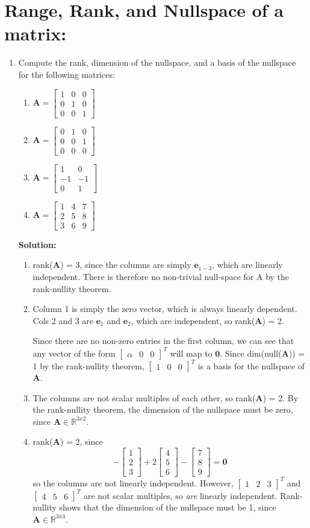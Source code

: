 \documentclass[]{article}
\newcommand{\R}{\mathbb{R}}				%
\newcommand{\bbm}{\begin{bmatrix}}		%
\newcommand{\ebm}{\end{bmatrix}}		%
\newcommand{\A}{\bm{A}}					%
\newcommand{\solution}{\vskip 0.5cm \textbf{\large Solution:} \\}
\begin{document}
    \section*{Range, Rank, and Nullspace of a matrix:}
    \begin{enumerate}[resume]
	\item Compute the rank, dimension of the nullspace, and a basis of the nullspace for the following matrices:
	  \begin{enumerate}
	  \item $\A = \bbm 1&0&0\\0&1&0\\0&0&1 \ebm$
	  \item $\A = \bbm 0&1&0\\0&0&1\\0&0&0 \ebm$
	  \item $\A = \bbm 1&0\\-1&-1\\0&1 \ebm$
	  \item $\A = \bbm 1&4&7\\2&5&8\\3&6&9 \ebm$
	  \end{enumerate}

	  \solution
	  \begin{enumerate}
	  \item rank($\A$) = 3, since the columns are simply
        $\bm{e}_{1-3}$, which are linearly independent. There is
        therefore no non-trivial null-space for A by the rank-nullity
        theorem.
        
	  \item Column 1 is simply the zero vector, which is always
        linearly dependent. Cols 2 and 3 are $\bm{e}_1$ and
        $\bm{e}_2$, which are independent, so rank($\A$) = 2.

        Since there are no non-zero entries in the first column, we
        can see that any vector of the form $ \bbm \alpha & 0 & 0 \ebm^T$ will map
        to $\bm{0}$. Since dim(null($\A$)) = 1 by the rank-nullity
        theorem, $\bbm 1 & 0 & 0 \ebm^T$ is a basis for the nullspace of $\A$.

      \item The columns are not scalar multiples of each other, so
        rank($\A$) = 2. By the rank-nullity theorem, the dimension
        of the nullspace must be zero, since $\A \in \R^{3x2}$.

	  \item rank($\A$) = 2, since
        \[
         -\bbm 1 \\ 2 \\ 3 \ebm + 2 \bbm 4 \\ 5 \\ 6 \ebm - \bbm 7 \\ 8 \\ 9 \ebm = \bm{0}
        \]
        so the columns are not linearly independent. However, $\bbm 1
        & 2 & 3 \ebm^T$ and $\bbm 4 & 5 & 6 \ebm^T$ are not scalar
        multiples, so {\em are} linearly independent. Rank-nullity
        shows that the dimension of the nullspace must be 1, since
        $\A \in \R^{3x3}$.


\end{enumerate}
\end{enumerate}
\end{document}

